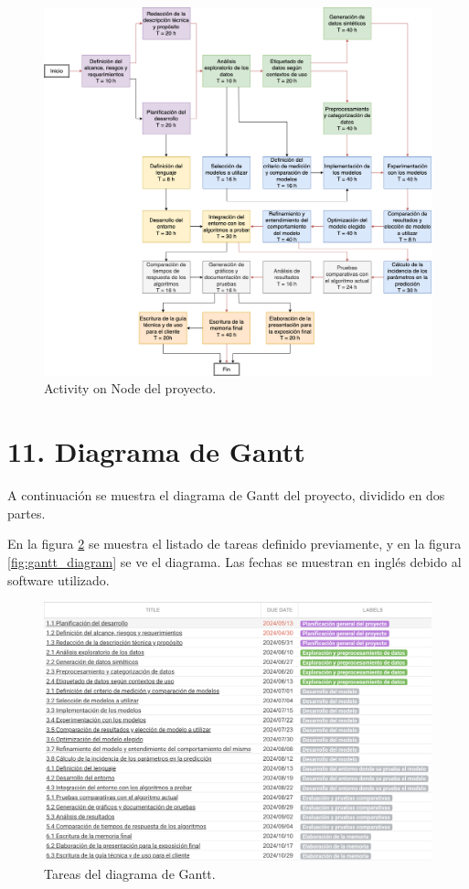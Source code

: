 \documentclass[
11pt, %
]{charter}
\begin{document}
\begin{figure}[htpb]
	\centering 
	\includegraphics[width=1\textwidth]{./Figuras/amrra-AON.png}
	\caption{Activity on Node del proyecto.}
	\label{fig:aon}
\end{figure}

\section{11. Diagrama de Gantt}
\label{sec:gantt}

A continuación se muestra el diagrama de Gantt del proyecto, dividido en dos partes.

En la figura \ref{fig:gantt_tareas} se muestra el listado de tareas definido previamente, y en la figura  \ref{fig:gantt_diagram} se ve el diagrama. Las fechas se muestran en inglés debido al software utilizado. 

	\begin{figure}[htpb]
		\centering 
		\includegraphics[height=.45\textheight]{./Figuras/gantt_tareas.png}
		\caption{Tareas del diagrama de Gantt.} %
		\label{fig:gantt_tareas}
	\end{figure}
\end{document}

